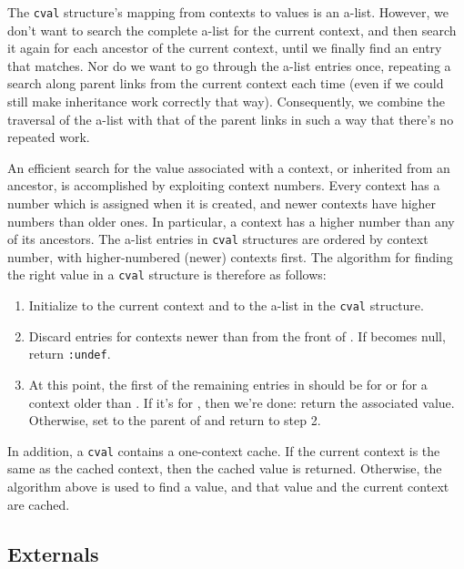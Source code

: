 The {\tt cval} structure's mapping from contexts to values is an
a-list.  However, we don't want to search the complete a-list for the
current context, and then search it again for each ancestor of the
current context, until we finally find an entry that matches.  Nor do
we want to go through the a-list entries once, repeating a search
along parent links from the current context each time (even if we
could still make inheritance work correctly that way).  Consequently,
we combine the traversal of the a-list with that of the parent links
in such a way that there's no repeated work.

An efficient search for the value associated with a context, or
inherited from an ancestor, is accomplished by exploiting context
numbers.  Every context has a number which is assigned when it is
created, and newer contexts have higher numbers than older ones.  In
particular, a context has a higher number than any of its ancestors.
The a-list entries in {\tt cval} structures are ordered by context
number, with higher-numbered (newer) contexts first.  The algorithm
for finding the right value in a {\tt cval} structure is therefore as 
follows:

\begin{enumerate}

\item Initialize  to the current context and 
      to the a-list in the {\tt cval} structure.

\item Discard entries for contexts newer than  from the
      front of .  If  becomes null, return
      {\tt :undef}.

\item At this point, the first of the remaining entries in 
      should be for  or for a context older than .
      If it's for , then we're done: return the associated
      value.  Otherwise, set  to the parent of 
      and return to step 2.

\end{enumerate}

In addition, a {\tt cval} contains a one-context cache.  If the
current context is the same as the cached context, then the cached
value is returned.  Otherwise, the algorithm above is used to find a
value, and that value and the current context are cached.


\subsection{Externals}


